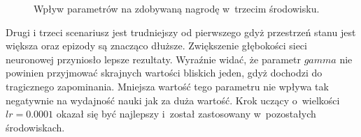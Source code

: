 \documentclass[12pt, oneside]{article}
\begin{document}
\begin{figure}[h]
    \qquad
    \caption{Wpływ parametrów na zdobywaną nagrodę w~trzecim środowisku.}
\end{figure}
Drugi i trzeci scenariusz jest trudniejszy od pierwszego gdyż przestrzeń stanu jest większa oraz epizody są znacząco dłuższe. Zwiększenie głębokości sieci neuronowej przyniosło lepsze rezultaty. Wyraźnie widać, że parametr $gamma$ nie powinien przyjmować skrajnych wartości bliskich jeden, gdyż dochodzi do tragicznego zapominania. Mniejsza wartość tego parametru nie wpływa tak negatywnie na wydajność nauki jak za duża wartość. Krok uczący o~wielkości $lr=0.0001$ okazał się być najlepszy i~został zastosowany w~pozostałych środowiskach.
\end{document}
